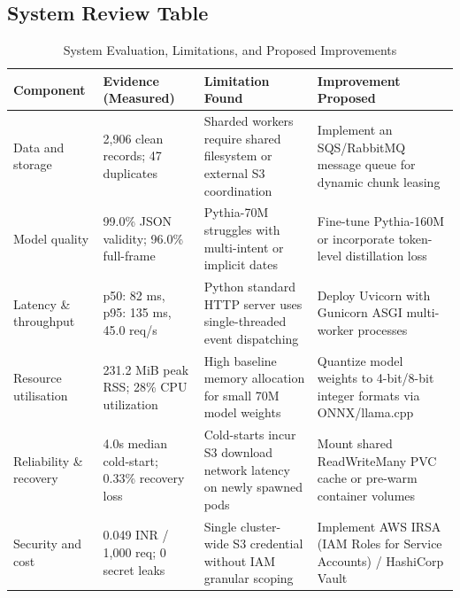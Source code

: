 \documentclass[10pt,a4paper]{article}
\begin{document}
\subsection{System Review Table}
\begin{table}[h!]
\footnotesize
\centering
\caption{System Evaluation, Limitations, and Proposed Improvements}
\begin{tabularx}{\textwidth}{l p{2.6cm} X X}
\toprule
\textbf{Component} & \textbf{Evidence (Measured)} & \textbf{Limitation Found} & \textbf{Improvement Proposed} \\
\midrule
Data and storage & 2,906 clean records; 47 duplicates & Sharded workers require shared filesystem or external S3 coordination & Implement an SQS/RabbitMQ message queue for dynamic chunk leasing \\
Model quality & 99.0\% JSON validity; 96.0\% full-frame & Pythia-70M struggles with multi-intent or implicit dates & Fine-tune Pythia-160M or incorporate token-level distillation loss \\
Latency \& throughput & p50: 82 ms, p95: 135 ms, 45.0 req/s & Python standard HTTP server uses single-threaded event dispatching & Deploy Uvicorn with Gunicorn ASGI multi-worker processes \\
Resource utilisation & 231.2 MiB peak RSS; 28\% CPU utilization & High baseline memory allocation for small 70M model weights & Quantize model weights to 4-bit/8-bit integer formats via ONNX/llama.cpp \\
Reliability \& recovery & 4.0s median cold-start; 0.33\% recovery loss & Cold-starts incur S3 download network latency on newly spawned pods & Mount shared ReadWriteMany PVC cache or pre-warm container volumes \\
Security and cost & 0.049 INR / 1,000 req; 0 secret leaks & Single cluster-wide S3 credential without IAM granular scoping & Implement AWS IRSA (IAM Roles for Service Accounts) / HashiCorp Vault \\
\bottomrule
\end{tabularx}
\end{table}
\end{document}
